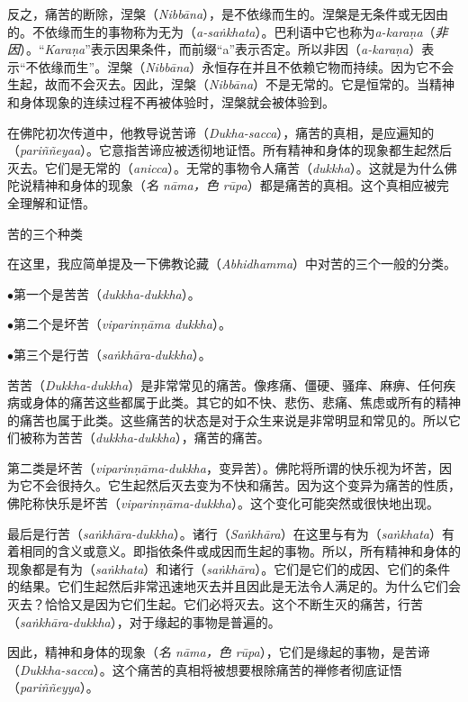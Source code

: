 反之，痛苦的断除，涅槃（{\it Nibb\=ana}），是不依缘而生的。涅槃是无条件或无因由的。不依缘而生的事物称为无为（{\it a-sa\.nkhata}）。巴利语中它也称为{\it a-kara\d na}（{\it 非因}）。“{\it Kara\d na}”表示因果条件，而前缀“a”表示否定。所以非因（{\it a-kara\d na}）表示“不依缘而生”。涅槃（{\it Nibb\=ana}）永恒存在并且不依赖它物而持续。因为它不会生起，故而不会灭去。因此，涅槃（{\it Nibb\=ana}）不是无常的。它是恒常的。当精神和身体现象的连续过程不再被体验时，涅槃就会被体验到。

在佛陀初次传道中，他教导说苦谛（{\it Dukha-sacca}），痛苦的真相，是应遍知的（{\it pari\~n\~neyaa}）。它意指苦谛应被透彻地证悟。所有精神和身体的现象都生起然后灭去。它们是无常的（{\it anicca}）。无常的事物\1令人痛苦（{\it dukkha}）。这就是为什么佛陀说精神和身体的现象（{\it 名 n\=ama，色 r\=upa}）都是痛苦的真相。这个真相应被完全理解和证悟。

\sssubsectnonb 苦的三个种类

在这里，我应简单提及一下佛教论藏（{\it Abhidhamma}）中对苦的三个一般的分类。

{
\leftskip=1.6pc
\item{$\bullet$}第一个是苦苦（{\it dukkha-dukkha}）。
\item{$\bullet$}第二个是坏苦（{\it viparin\d n\=ama dukkha}）。
\item{$\bullet$}第三个是行苦（{\it sa\.nkh\=ara-dukkha}）。

}

苦苦（{\it Dukkha-dukkha}）是非常常见的痛苦。像疼痛、僵硬、骚痒、麻痹、任何疾病或身体的痛苦这些都属于此类。其它的如不快、悲伤、悲痛、焦虑或所有的精神的痛苦也属于此类。这些痛苦的状态是对于众生来说是非常明显和常见的。所以它们被称为苦苦（{\it dukkha-dukkha}），痛苦的痛苦。

第二类是坏苦（{\it viparin\d n\=ama-dukkha}，变异苦）。佛陀将所谓的快乐视为坏苦，因为它不会很持久。它生起然后灭去变为不快和痛苦。因为这个变异为痛苦的性质，佛陀称快乐是坏苦（{\it viparin\d n\=ama-dukkha}）。这个变化可能突然或很快地出现。

最后是行苦（{\it sa\.nkh\=ara-dukkha}）。诸行（{\it Sa\.nkh\=ara}）在这里与有为（{\it sa\.nkhata}）有着相同的含义或意义。即指依条件或成因而生起的事物。所以，所有精神和身体的现象都是有为（{\it sa\.nkhata}）\1和诸行（{\it sa\.nkh\=ara}）。它们是它们的成因、它们的条件的结果。它们生起然后非常迅速地灭去并且因此是无法令人满足的。为什么它们会灭去？恰恰又是因为它们生起。它们必将灭去。这个不断生灭的痛苦，行苦（{\it sa\.nkh\=ara-dukkha}），对于缘起的事物是普遍的。

因此，精神和身体的现象（{\it 名 n\=ama，色 r\=upa}），它们是缘起的事物，是苦谛（{\it Dukkha-sacca}）。这个痛苦的真相将被想要根除痛苦的禅修者彻底证悟（{\it pari\~n\~neyya}）。

